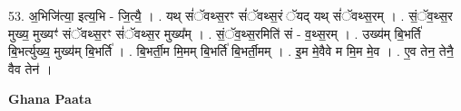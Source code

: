 \documentclass[17pt]{extarticle}
\begin{document}
53. अ॒भिजि॑त्या॒ इत्य॒भि - जि॒त्यै॒ । . यथ् सं॑ॅवथ्स॒रꣳ सं॑ॅवथ्स॒रं ॅयद् यथ् सं॑ॅवथ्स॒रम् । . सं॒ॅव॒थ्स॒र मुख्य॒ मुख्यꣳ॑ संॅवथ्स॒रꣳ सं॑ॅवथ्स॒र मुख्य᳚म् । . सं॒ॅव॒थ्स॒रमिति॑ सं - व॒थ्स॒रम् । . उख्य॑म् बि॒भर्ति॑ बि॒भर्त्युख्य॒ मुख्य॑म् बि॒भर्ति॑ । . बि॒भर्ती॒म मि॒मम् बि॒भर्ति॑ बि॒भर्ती॒मम् । . इ॒म मे॒वैवे म मि॒म मे॒व । . ए॒व तेन॒ तेनै॒ वैव तेन॑ । \newline

\textbf{Ghana Paata } \newline
\end{document}
